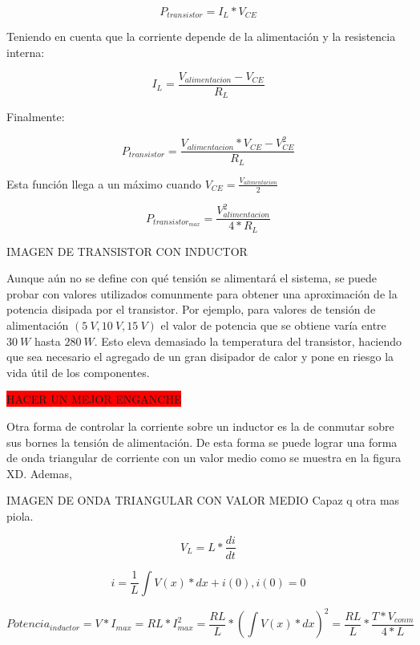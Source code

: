 \begin{equation}
	P_{transistor} = I_L*V_{CE}
\end{equation}

Teniendo en cuenta que la corriente depende de la alimentación y la resistencia interna:

\begin{equation}
	I_L=\frac{V_{alimentacion}-V_{CE}}{R_L}
\end{equation}

Finalmente:

\begin{equation}
	P_{transistor}=\frac{V_{alimentacion}*V_{CE}-V_{CE}^2}{R_L}
\end{equation}

Esta función llega a un máximo cuando $V_{CE}=\frac{V_{alimentacion}}{2}$


\begin{equation}
	P_{transistor_{max}}=\frac{V_{alimentacion}^2}{4*R_L}
\end{equation}

IMAGEN DE TRANSISTOR CON INDUCTOR

Aunque aún no se define con qué tensión se alimentará el sistema, se puede probar con valores utilizados comunmente para obtener una aproximación de la potencia disipada por el transistor. Por ejemplo, para valores de tensión de alimentación $(5\:V,10\:V,15\:V)$ el valor de potencia que se obtiene varía entre $30\:W$ hasta $280\:W$. Esto eleva demasiado la temperatura del transistor, haciendo que sea necesario el agregado de un gran disipador de calor y pone en riesgo la vida útil de los componentes.

\colorbox{red}{HACER UN MEJOR ENGANCHE}

Otra forma de controlar la corriente sobre un inductor es la de conmutar sobre sus bornes la tensión de alimentación. De esta forma se puede lograr una forma de onda triangular de corriente con un valor medio como se muestra en la figura XD. Ademas,

IMAGEN DE ONDA TRIANGULAR CON VALOR MEDIO Capaz q otra mas piola.


\begin{equation}
V_{L} =L*\frac{di}{dt}
\end{equation}

\begin{equation}
i =\frac{1}{L}\int{V(x)*dx}+i(0) , i(0)=0
\end{equation}

\begin{equation}
Potencia_{inductor} = V*I_{max}=RL*I_{max}^2=\frac{RL}{L}*(\int{V(x)*dx})^2=\frac{RL}{L}*\frac{T*V_{conm}}{4*L}
\end{equation}

